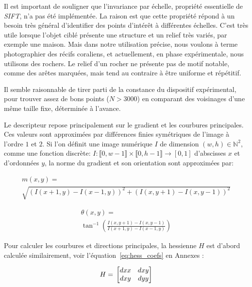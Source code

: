 \documentclass[
	a4paper, %
	10pt, %
	unnumberedsections, %
	twoside, %
]{LTJournalArticle}
\begin{document}
Il est important de souligner que l'invariance par échelle, propriété essentielle de \textit{SIFT},
n'a pas été implémentée. La raison est que cette propriété
répond à un besoin très général d'identifier des points d'intérêt à différentes
échelles. C'est très utile lorsque l'objet ciblé présente une structure et
un relief très variés, par exemple une maison. Mais dans notre utilisation précise,
nous voulons à terme photographier des récifs coraliens, et actuellement, en
phase expérimentale, nous utilisons des rochers. Le relief d'un rocher ne présente
pas de motif notable, comme des arêtes marquées, mais tend au contraire à être
uniforme et répétitif.

Il semble raisonnable de tirer parti de la
constance du dispositif expérimental, pour trouver assez de bons points ($N > 3000$)
en comparant des voisinages d'une même taille fixe, déterminée à l'avance.



Le descripteur repose principalement sur le gradient et les courbures principales.
Ces valeurs sont approximées par différences finies symétriques de l'image à l'ordre $1$ et $2$.
Si l'on définit une image numérique $I$ de dimension $(w, h) \in \mathbb{N}^2$,
comme une fonction discrète:
$I: \llbracket 0, w-1 \rrbracket \times \llbracket 0, h-1 \rrbracket \rightarrow [0, 1]$
d'abscisses $x$ et d'ordonnées $y$, la norme du gradient
et son orientation sont approximées par:

\begin{multline} \label{eq:magnitude_grad}
	m(x, y) = \\
	\sqrt{(I(x+1, y) - I(x-1,y))^2 + (I(x,y+1)-I(x,y-1))^2}
\end{multline}

\begin{multline} \label{eq:angle_grad}
	\theta(x, y) = \\
	\tan^{-1}\left(\frac{I(x,y+1)-I(x,y-1)}{I(x+1, y) - I(x-1,y)}\right)
\end{multline}

Pour calculer les courbures et directions principales, la hessienne $H$ est d'abord calculée
similairement, voir l'équation~\ref{eq:hess_coefs} en Annexes :

\begin{equation}
	H = \\
	\begin{bmatrix}
		dxx & dxy \\
		dxy & dyy
	\end{bmatrix}
\end{equation}
\end{document}
